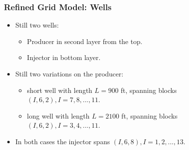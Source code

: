 \begin{frame}
    \frametitle{Refined Grid Model: Wells}
    \begin{itemize}
        \item Still two wells:
        \begin{itemize}
            \item Producer in second layer from the top.
            \item Injector in bottom layer.
        \end{itemize}
        \pause
        \item Still two variations on the producer:
        \begin{itemize}
            \item short well with length $L=900$ ft, spanning blocks $(I,6,2), I=7,8,...,11$.
            \item long well with length $L=2100$ ft, spanning blocks $(I,6,2), I=3,4,...,11$.
        \end{itemize}
        \pause
        \item In both cases the injector spans $(I,6,8), I=1,2,...,13$.
    \end{itemize}
\end{frame}
